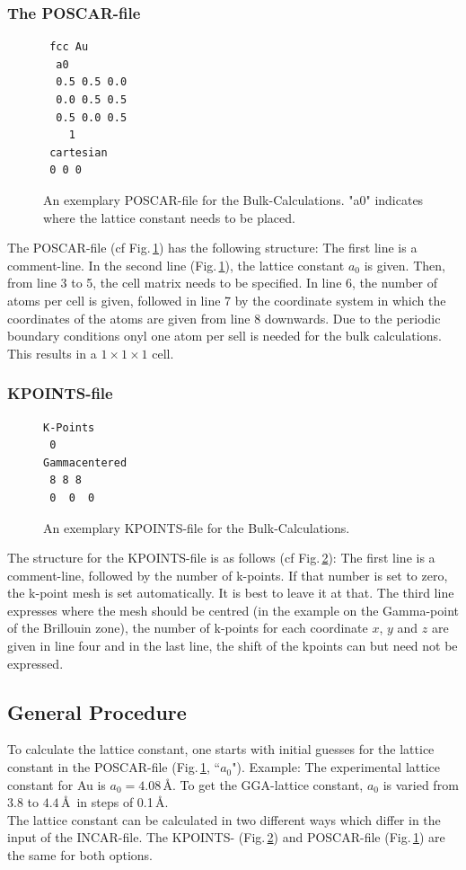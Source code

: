 \documentclass[11pt,oneside,a4paper, captions=nooneline, headsepline]{article}%
\begin{document}
\subsubsection*{The POSCAR-file}
\begin{figure}[h!]
\begin{verbatim}
 fcc Au
  a0
  0.5 0.5 0.0
  0.0 0.5 0.5
  0.5 0.0 0.5
    1
 cartesian
 0 0 0
\end{verbatim}
\caption{An exemplary POSCAR-file for the Bulk-Calculations. "a0" indicates where the lattice constant needs to be placed.}
\label{bposcar}
\end{figure}
The POSCAR-file (cf Fig.\,\ref{bposcar}) has the following structure: The first line is a comment-line. In the second line (Fig.\,\ref{bposcar}), the lattice constant $a_0$ is given. Then, from line 3 to 5, the cell matrix needs to be specified. In line 6, the number of atoms per cell is given, followed in line 7 by the coordinate system in which the coordinates of the atoms are given from line 8 downwards. Due to the periodic boundary conditions onyl one atom per sell is needed for the bulk calculations. This results in a $1\times1\times1$ cell.
\subsubsection*{KPOINTS-file}
\begin{figure}[h!]
\begin{verbatim}
K-Points
 0
Gammacentered
 8 8 8
 0  0  0
\end{verbatim}
\caption{An exemplary KPOINTS-file for the Bulk-Calculations.}
\label{bkp}
\end{figure}
The structure for the KPOINTS-file is as follows (cf Fig.\,\ref{bkp}): The first line is a comment-line, followed by the number of k-points. If that number is set to zero, the k-point mesh is set automatically. It is best to leave it at that. The third line expresses where the mesh should be centred (in the example on the Gamma-point of the Brillouin zone), the number of k-points for each coordinate $x$, $y$ and $z$ are given in line four and in the last line, the shift of the kpoints can but need not be expressed.\\
\subsection{General Procedure}
To calculate the lattice constant, one starts with initial guesses for the lattice constant in the POSCAR-file (Fig.\,\ref{bposcar}, ``$a_0$"). Example: The experimental lattice constant for Au is $a_0=4.08$\,\AA. To get the GGA-lattice constant, $a_0$ is varied from $3.8$ to $4.4$\,\AA~in steps of 0.1\,\AA.\\
The lattice constant can be calculated in two different ways which differ in the input of the INCAR-file. The KPOINTS- (Fig.\,\ref{bkp}) and POSCAR-file (Fig.\,\ref{bposcar}) are the same for both options.
\end{document}
